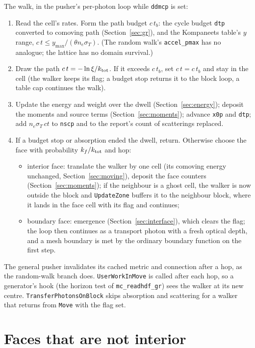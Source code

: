 \documentclass[11pt]{article}
\newcommand{\key}[1]{\texttt{#1}}
\begin{document}
The walk, in the pusher's per-photon loop while \texttt{ddmcp} is set:
\begin{enumerate}
\item Read the cell's rates.  Form the path budget $c\,t_b$: the cycle budget
  \texttt{dtp} converted to comoving path (Section~\ref{sec:gr}), and the Kompaneets
  table's $y$ range, $c\,t \le y_{\max}/(\theta n_e\sigma_T)$.  (The random walk's
  \key{accel\_pmax} has no analogue; the lattice has no domain survival.)
\item Draw the path $c\,t = -\ln\xi/k_{\rm tot}$.  If it exceeds $c\,t_b$, set $c\,t =
  c\,t_b$ and stay in the cell (the walker keeps its flag; a budget stop returns it
  to the block loop, a table cap continues the walk).
\item Update the energy and weight over the dwell (Section~\ref{sec:energy}); deposit
  the moments and source terms (Section~\ref{sec:moments}); advance \texttt{x0p} and
  \texttt{dtp}; add $n_e\sigma_T\,ct$ to \texttt{nscp} and to the report's count of
  scatterings replaced.
\item If a budget stop or absorption ended the dwell, return.  Otherwise choose the
  face with probability $k_f/k_{\rm tot}$ and hop:
  \begin{itemize}
  \item interior face: translate the walker by one cell (its comoving energy
    unchanged, Section~\ref{sec:moving}), deposit the face
    counters (Section~\ref{sec:moments}); if the neighbour is a ghost cell, the walker
    is now outside the block and \texttt{UpdateZone} buffers it to the neighbour
    block, where it lands in the face cell with its flag and continues;
  \item boundary face: emergence (Section~\ref{sec:interface}), which clears the flag;
    the loop then continues as a transport photon with a fresh optical depth, and a
    mesh boundary is met by the ordinary boundary function on the first step.
  \end{itemize}
\end{enumerate}
The general pusher invalidates its cached metric and connection after a hop, as the
random-walk branch does.  \texttt{UserWorkInMove} is called after each hop, so a
generator's hook (the horizon test of \texttt{mc\_readhdf\_gr}) sees the walker at
its new centre.  \texttt{TransferPhotonsOnBlock} skips absorption and scattering for a
walker that returns from \texttt{Move} with the flag set.

\section{Faces that are not interior}
\label{sec:faces}
\end{document}
